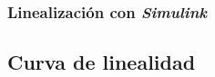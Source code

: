 \documentclass{ieeeaccess}
\begin{document}
\subsubsection{Linealización con \textit{Simulink}}
\subsection{Curva de linealidad}
\EOD{}
\end{document}
